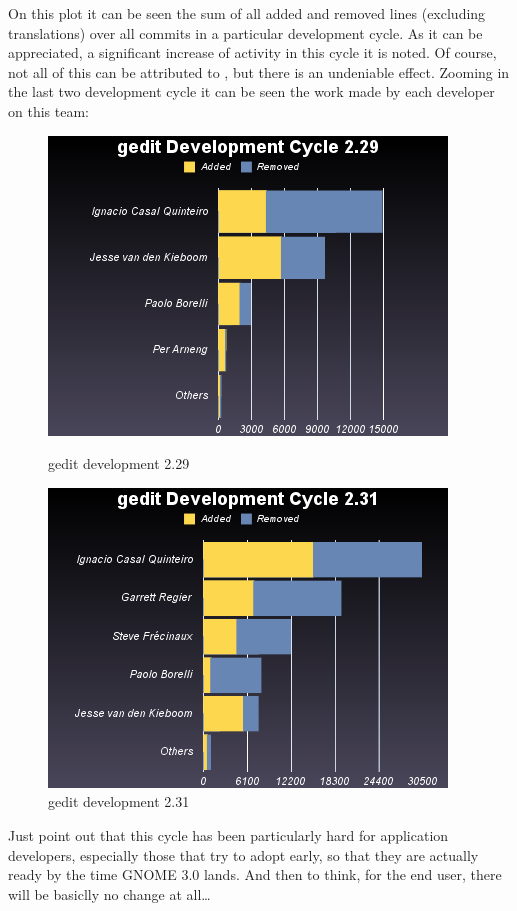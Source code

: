 
On this plot it can be seen the sum of all added and removed lines (excluding translations) over all commits in a particular development cycle. As it can be appreciated, a significant increase of activity in this cycle it is noted. Of course, not all of this can be attributed to , but there is an undeniable effect. Zooming in the last two development cycle it can be seen the work made by each developer on this team:

\begin{figure}[ht]
  \begin{minipage}[b]{0.5\linewidth}
    \centering
    \includegraphics[scale=0.45]{./images/gedit-development-2-29}
    \caption{gedit development 2.29}
  \end{minipage}
  \hspace{0.5cm}
  \begin{minipage}[b]{0.5\linewidth}
    \centering
    \includegraphics[scale=0.45]{./images/gedit-development-2-31}
    \caption{gedit development 2.31}
  \end{minipage}
\end{figure}

Just point out that this cycle has been particularly hard for application developers, especially those that try to adopt early, so that they are actually ready by the time GNOME 3.0 lands. And then to think, for the end user, there will be basiclly no change at all…
